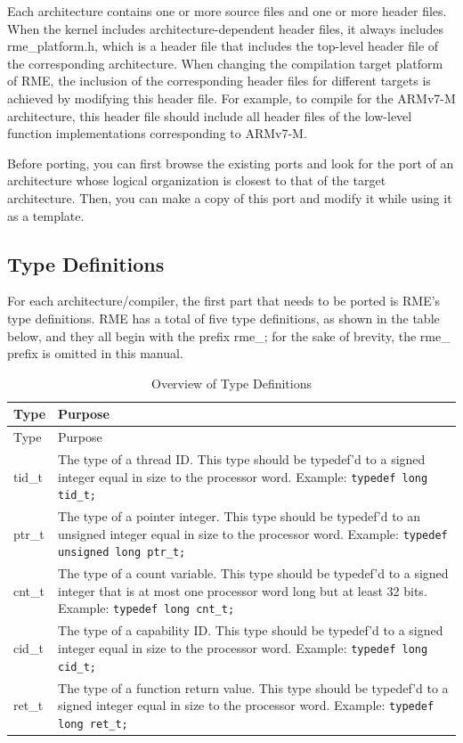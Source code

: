 Each architecture contains one or more source files and one or more header files. When the kernel includes architecture-dependent header files, it always includes rme\_platform.h, which is a header file that includes the top-level header file of the corresponding architecture. When changing the compilation target platform of RME, the inclusion of the corresponding header files for different targets is achieved by modifying this header file. For example, to compile for the ARMv7-M architecture, this header file should include all header files of the low-level function implementations corresponding to ARMv7-M.

Before porting, you can first browse the existing ports and look for the port of an architecture whose logical organization is closest to that of the target architecture. Then, you can make a copy of this port and modify it while using it as a template.

\subsection{Type Definitions}\label{subsec:7-type-definitions}

For each architecture/compiler, the first part that needs to be ported is RME's type definitions. RME has a total of five type definitions, as shown in the table below, and they all begin with the prefix rme\_; for the sake of brevity, the rme\_ prefix is omitted in this manual.

\begin{xltabular}{\textwidth}{@{}>{\hsize\raggedright\arraybackslash}X>{\hsize\raggedright\arraybackslash}X@{}}
\caption{Overview of Type Definitions}\label{tab:7-1-type-definitions-overview}\\
\toprule
Type & Purpose\tabularnewline
\endfirsthead
\toprule
Type & Purpose\tabularnewline
\midrule
\endhead
\bottomrule
\endlastfoot
    tid\_t & The type of a thread ID. This type should be typedef'd to a signed integer equal in size to the processor word. \newline Example: \texttt{typedef long tid\_t;}\tabularnewline
    ptr\_t & The type of a pointer integer. This type should be typedef'd to an unsigned integer equal in size to the processor word. \newline Example: \texttt{typedef unsigned long ptr\_t;}\tabularnewline
    cnt\_t & The type of a count variable. This type should be typedef'd to a signed integer that is at most one processor word long but at least 32 bits. \newline Example: \texttt{typedef long cnt\_t;}\tabularnewline
    cid\_t & The type of a capability ID. This type should be typedef'd to a signed integer equal in size to the processor word. \newline Example: \texttt{typedef long cid\_t;}\tabularnewline
    ret\_t & The type of a function return value. This type should be typedef'd to a signed integer equal in size to the processor word. \newline Example: \texttt{typedef long ret\_t;}\tabularnewline
\end{xltabular}
\nopagebreak[4]

